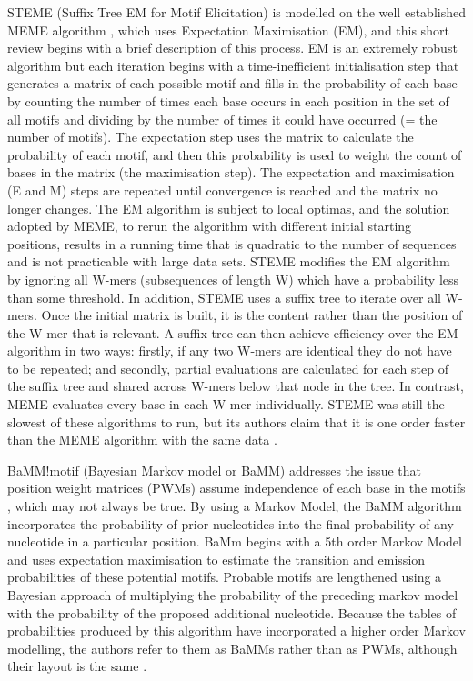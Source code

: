 \documentclass[12pt]{article}
\begin{document}
STEME (Suffix Tree EM for Motif Elicitation) \citep{reid2011steme} is modelled on the well established MEME algorithm \citep{bailey2009meme}, which uses Expectation Maximisation (EM), and this short review begins with a brief description of this process. EM is an extremely robust algorithm but each iteration begins with a time-inefficient initialisation step that generates a matrix of each possible motif and fills in the probability of each base by counting the number of times each base occurs in each position in the set of all motifs and dividing by the number of times it could have occurred (= the number of motifs). The expectation step uses the matrix to calculate the probability of each motif, and then this probability is used to weight the count of bases in the matrix (the maximisation step). The expectation and maximisation (E and M) steps are repeated until convergence is reached and the matrix no longer changes. The EM algorithm is subject to local optimas, and the solution adopted by MEME, to rerun the algorithm with different initial starting positions, results in a running time that is quadratic to the number of sequences and is not practicable with large data sets. STEME modifies the EM algorithm by ignoring all W-mers (subsequences of length W) which have a probability less than some threshold. In addition, STEME uses a suffix tree to iterate over all W-mers. Once the initial matrix is built, it is the content rather than the position of the W-mer that is relevant. A suffix tree can then achieve efficiency over the EM algorithm in two ways: firstly, if any two W-mers are identical they do not have to be repeated; and secondly, partial evaluations are calculated for each step of the suffix tree and shared across W-mers below that node in the tree. In contrast, MEME evaluates every base in each W-mer individually. STEME was still the slowest of these algorithms to run, but its authors claim that it is one order faster than the MEME algorithm with the same data \citep{reid2011steme}.

BaMM!motif (Bayesian Markov model or BaMM) \citep{siebert2016bayesian} addresses the issue that position weight matrices (PWMs) assume independence of each base in the motifs \citep{Jayaram2016}, which may not always be true. By using a Markov Model, the BaMM algorithm incorporates the probability of prior nucleotides into the final probability of any nucleotide in a particular position. BaMm begins with a 5th order Markov Model and uses expectation maximisation to estimate the transition and emission probabilities of these potential motifs. Probable motifs are lengthened using a Bayesian approach of multiplying the probability of the preceding markov model with the probability of the proposed additional nucleotide. Because the tables of probabilities produced by this algorithm have incorporated a higher order Markov modelling, the authors refer to them as BaMMs rather than as PWMs, although their layout is the same \citep{siebert2016bayesian}.
\end{document}
